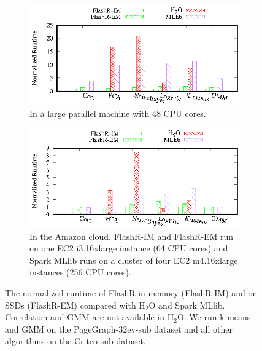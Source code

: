 \begin{figure}
	\centering
	\footnotesize
	\begin{subfigure}{.5\textwidth}
		\includegraphics{FlashMatrix_figs/FlashR-vs-dist.eps}
		\caption{In a large parallel machine with 48 CPU cores.}
		\label{perf:para}
	\end{subfigure}

	\vspace{3pt}
	\begin{subfigure}{.5\textwidth}
		\includegraphics{FlashMatrix_figs/FlashR-vs-dist-EC2.eps}
		\caption{In the Amazon cloud. FlashR-IM and FlashR-EM run on one
			EC2 i3.16xlarge instance (64 CPU cores) and Spark MLlib runs
		on a cluster of four EC2 m4.16xlarge instances (256 CPU cores).}
		\label{perf:cloud}
	\end{subfigure}
	\vspace{-8pt}
	\caption{The normalized runtime of FlashR in memory (FlashR-IM) and
	on SSDs (FlashR-EM) compared with H$_2$O and Spark MLlib. Correlation and GMM
	are not available in H$_2$O. We run k-means and GMM on the PageGraph-32ev-sub
	dataset and all other algorithms on the Criteo-sub dataset.}
	\label{perf:rt}
  \vspace{-10pt}
\end{figure}

